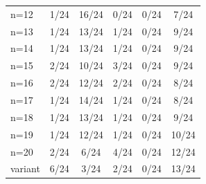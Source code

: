\begin{tabular}{lccccc}
n=12 & \cellcolor[HTML]{FFFFFF} 1/24 & \cellcolor[HTML]{EA4646} 16/24 & \cellcolor[HTML]{9670BD} 0/24 & \cellcolor[HTML]{8FEB32} 0/24 & \cellcolor[HTML]{19C8C8} 7/24 \\
n=13 & \cellcolor[HTML]{FFFFFF} 1/24 & \cellcolor[HTML]{EA4646} 13/24 & \cellcolor[HTML]{9670BD} 1/24 & \cellcolor[HTML]{8FEB32} 0/24 & \cellcolor[HTML]{19C8C8} 9/24 \\
n=14 & \cellcolor[HTML]{FFFFFF} 1/24 & \cellcolor[HTML]{EA4646} 13/24 & \cellcolor[HTML]{9670BD} 1/24 & \cellcolor[HTML]{8FEB32} 0/24 & \cellcolor[HTML]{19C8C8} 9/24 \\
n=15 & \cellcolor[HTML]{FFFFFF} 2/24 & \cellcolor[HTML]{EA4646} 10/24 & \cellcolor[HTML]{9670BD} 3/24 & \cellcolor[HTML]{8FEB32} 0/24 & \cellcolor[HTML]{19C8C8} 9/24 \\
n=16 & \cellcolor[HTML]{FFFFFF} 2/24 & \cellcolor[HTML]{EA4646} 12/24 & \cellcolor[HTML]{9670BD} 2/24 & \cellcolor[HTML]{8FEB32} 0/24 & \cellcolor[HTML]{19C8C8} 8/24 \\
n=17 & \cellcolor[HTML]{FFFFFF} 1/24 & \cellcolor[HTML]{EA4646} 14/24 & \cellcolor[HTML]{9670BD} 1/24 & \cellcolor[HTML]{8FEB32} 0/24 & \cellcolor[HTML]{19C8C8} 8/24 \\
n=18 & \cellcolor[HTML]{FFFFFF} 1/24 & \cellcolor[HTML]{EA4646} 13/24 & \cellcolor[HTML]{9670BD} 1/24 & \cellcolor[HTML]{8FEB32} 0/24 & \cellcolor[HTML]{19C8C8} 9/24 \\
n=19 & \cellcolor[HTML]{FFFFFF} 1/24 & \cellcolor[HTML]{EA4646} 12/24 & \cellcolor[HTML]{9670BD} 1/24 & \cellcolor[HTML]{8FEB32} 0/24 & \cellcolor[HTML]{19C8C8} 10/24 \\
n=20 & \cellcolor[HTML]{FFFFFF} 2/24 & \cellcolor[HTML]{EA4646} 6/24 & \cellcolor[HTML]{9670BD} 4/24 & \cellcolor[HTML]{8FEB32} 0/24 & \cellcolor[HTML]{19C8C8} 12/24 \\
variant & \cellcolor[HTML]{FFFFFF} 6/24 & \cellcolor[HTML]{EA4646} 3/24 & \cellcolor[HTML]{9670BD} 2/24 & \cellcolor[HTML]{8FEB32} 0/24 & \cellcolor[HTML]{19C8C8} 13/24 \\
\bottomrule
\end{tabular}
